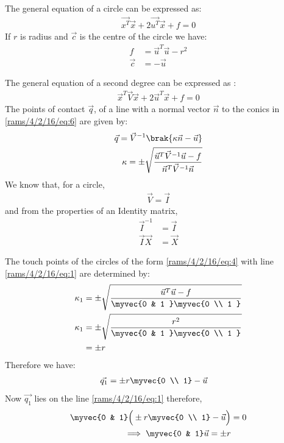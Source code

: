 
The general equation of a circle can be expressed as:
\begin{align}
\vec{x^T}\vec{x} + 2\vec{u^T}\vec{x} + f = 0 \label{rams/4/2/16/eq:4}
\end{align}
If $r$ is radius and $\vec{c}$ is the centre of the circle we have:
\begin{align}
f &=\vec{u}^T\vec{u}-r^2  \label{rams/4/2/16/eq:5} \\  
\vec{c} &=-\vec{u}
\end{align}

The general equation of a second degree can be expressed as :
\begin{align}
\vec{x}^T\vec{V}\vec{x}+2\vec{u}^T\vec{x}+f=0\label{rams/4/2/16/eq:6}
\end{align}
The points of contact $\vec{q}$, of a line with a normal vector $\vec{n}$ to the conics in \eqref{rams/4/2/16/eq:6} are given by:
\begin{align}
\vec{q} = \vec{V}^{-1}\brak{\kappa \vec{n}-\vec{u}} \label{rams/4/2/16/eq:7} \\
\kappa = \pm \sqrt{\frac{\vec{u}^T\vec{V}^{-1}\vec{u}-f}{\vec{n}^T\vec{V}^{-1}\vec{n}}}\label{rams/4/2/16/eq:8}
\end{align}
We know that, for a circle, 
\begin{align}
\vec{V} = \vec{I}\label{rams/4/2/16/eq:9}  
\end{align}
and from the properties of an Identity matrix, 
\begin{align}
\vec{I}^{-1} &= \vec{I} \\
\vec{I}\vec{X} &= \vec{X}   
\end{align}

The touch points of the circles of the form \eqref{rams/4/2/16/eq:4}  with line \eqref{rams/4/2/16/eq:1} are determined by:
\begin{align}
\kappa_{1} &= \pm \sqrt{\frac{\vec{u}^T\vec{u}-f}{\myvec{0 & 1 }\myvec{0 \\ 1 }}} \\
\kappa_{1} &= \pm \sqrt{\frac{r^2}{\myvec{0 & 1 }\myvec{0 \\ 1 }}} \\
& =  \pm {r}
\end{align}
Therefore we have:
\begin{align}
\vec{q_{1}} &= \pm{r}\myvec{0 \\ 1} - \vec{u}
\end{align}
Now $\vec{q_{1}}$ lies on the line \eqref{rams/4/2/16/eq:1} therefore,
\begin{align}
\myvec{0 & 1}\Big(\pm{r}\myvec{0 \\ 1} - \vec{u}\Big) &= 0 \\
\implies \myvec{0 & 1}\vec{u} = \pm{r}\label{rams/4/2/16/eq:10}
\end{align}

